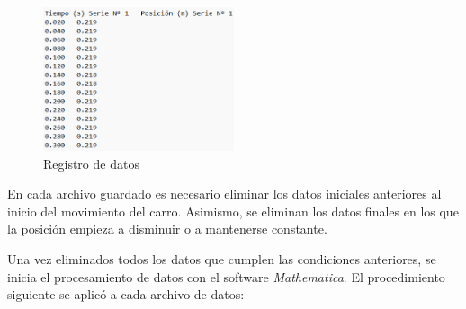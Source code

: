 \documentclass[12pt, titlepage]{report}
\begin{document}
    \begin{figure}[ht]
        \centering
        \includegraphics[width=0.5\textwidth]{Formato_Datos.png}
        \caption{Registro de datos}
    \end{figure}
    
    En cada archivo guardado es necesario eliminar los datos iniciales anteriores al inicio del movimiento del carro. Asimismo, se eliminan los datos finales en los que la posición empieza a disminuir o a mantenerse constante.
    
    Una vez eliminados todos los datos que cumplen las condiciones anteriores, se inicia el procesamiento de datos con el software \textit{Mathematica}. El procedimiento siguiente se aplicó a cada archivo de datos:
    
\end{document}
